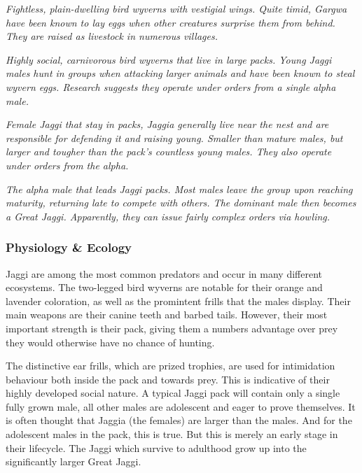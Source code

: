 \textit{Fightless, plain-dwelling bird wyverns with vestigial wings. Quite timid, Gargwa have been known to lay eggs when other creatures surprise them from behind. They are raised as livestock in numerous villages.}

\textit{Highly social, carnivorous bird wyverns that live in large packs. Young Jaggi males hunt in groups when attacking larger animals and have been known to steal wyvern eggs. Research suggests they operate under orders from a single alpha male.}

\textit{Female Jaggi that stay in packs, Jaggia generally live near the nest and are responsible for defending it and raising young. Smaller than mature males, but larger and tougher than the pack's countless young males. They also operate under orders from the alpha.}

\textit{The alpha male that leads Jaggi packs. Most males leave the group upon reaching maturity, returning late to compete with others. The dominant male then becomes a Great Jaggi. Apparently, they can issue fairly complex orders via howling.}

\subsubsection{Physiology \& Ecology}
Jaggi are among the most common predators and occur in many different ecosystems. The two-legged bird wyverns are notable for their orange and lavender coloration, as well as the promintent frills that the males display. Their main weapons are their canine teeth and barbed tails. However, their most important strength is their pack, giving them a numbers advantage over prey they would otherwise have no chance of hunting.

The distinctive ear frills, which are prized trophies, are used for intimidation behaviour both inside the pack and towards prey. This is indicative of their highly developed social nature. A typical Jaggi pack will contain only a single fully grown male, all other males are adolescent and eager to prove themselves. It is often thought that Jaggia (the females) are larger than the males. And for the adolescent males in the pack, this is true. But this is merely an early stage in their lifecycle. The Jaggi which survive to adulthood grow up into the significantly larger Great Jaggi.

